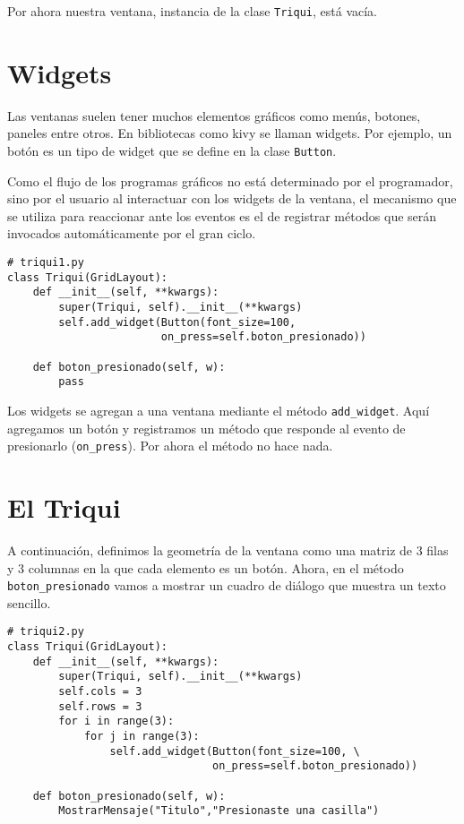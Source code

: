 Por ahora nuestra ventana, instancia de la clase \texttt{Triqui},
está vacía.

\section{Widgets}

Las ventanas suelen tener muchos elementos gráficos como menús, botones,
paneles entre otros. En bibliotecas como kivy se llaman widgets. Por
ejemplo, un botón es un tipo de widget que se define en la clase \texttt{Button}.

Como el flujo de los programas gráficos no está determinado por el
programador, sino por el usuario al interactuar con los widgets de
la ventana, el mecanismo que se utiliza para reaccionar ante los eventos
es el de registrar métodos que serán invocados automáticamente por
el gran ciclo.

\begin{lstlisting}
# triqui1.py
class Triqui(GridLayout):
    def __init__(self, **kwargs):
        super(Triqui, self).__init__(**kwargs)
        self.add_widget(Button(font_size=100, 
                        on_press=self.boton_presionado))
    
    def boton_presionado(self, w):
        pass
\end{lstlisting}

Los widgets se agregan a una ventana mediante el método \texttt{add\_widget}.
Aquí agregamos un botón y registramos un método que responde al evento
de presionarlo (\texttt{on\_press}). Por ahora el método no hace nada.

\section{El Triqui}

A continuación, definimos la geometría de la ventana como una matriz
de 3 filas y 3 columnas en la que cada elemento es un botón. Ahora,
en el método \texttt{boton\_presionado} vamos a mostrar un cuadro
de diálogo que muestra un texto sencillo.

\begin{lstlisting}
# triqui2.py
class Triqui(GridLayout):
    def __init__(self, **kwargs):
        super(Triqui, self).__init__(**kwargs)
        self.cols = 3
        self.rows = 3
        for i in range(3):
            for j in range(3):
                self.add_widget(Button(font_size=100, \
                                on_press=self.boton_presionado))
        
    def boton_presionado(self, w):
        MostrarMensaje("Titulo","Presionaste una casilla")
\end{lstlisting}

